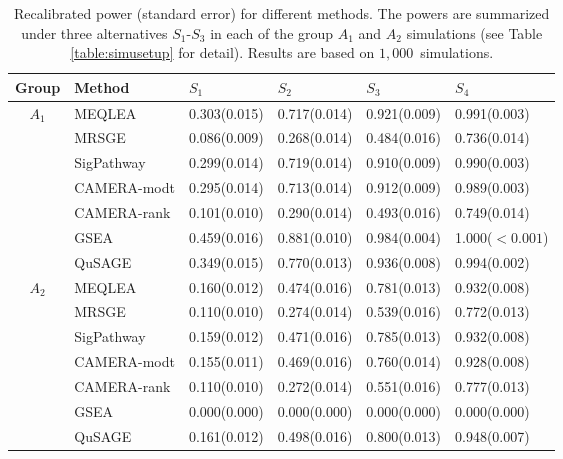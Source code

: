 \documentclass[useAMS,usenatbib, galley]{biom}
\newcommand{\CMR}{CAMERA-rank}
\newcommand{\CMT}{CAMERA-modt}
\newcommand{\gent}{SigPathway}
\newcommand{\genr}{MRSGE}
\newcommand{\HowmanySimu}{$1,000$}
\begin{document}
	\begin{table*}[ht]
			\centering
			\caption{Recalibrated power (standard error) for different methods. The powers are summarized under three alternatives $S_1$-$S_3$ in each of the group $A_1$ and $A_2$ simulations (see Table \ref{table:simusetup} for detail). Results are based on \HowmanySimu~simulations. }\label{table:power}
		\begin{tabular}{cl M{2.5cm}M{2.5cm}M{2.5cm}M{2.5cm}}
			\hline\hline
		Group & Method	& $S_1$ & $S_2$ & $S_3$	&$S_4$  \\ 
			\hline
		 &	MEQLEA  & 0.303(0.015) & 0.717(0.014) & 0.921(0.009) & 0.991(0.003) \\ 
		&	\genr & 0.086(0.009) & 0.268(0.014) & 0.484(0.016) & 0.736(0.014) \\ 
		&	\gent & 0.299(0.014) & 0.719(0.014) & 0.910(0.009) & 0.990(0.003) \\ 
		&	\CMT & 0.295(0.014) & 0.713(0.014) & 0.912(0.009) & 0.989(0.003) \\ 
		&	\CMR & 0.101(0.010) & 0.290(0.014) & 0.493(0.016) & 0.749(0.014)  \\ 
		&	GSEA & 0.459(0.016) & 0.881(0.010) & 0.984(0.004) & 1.000($<0.001$) \\ 
		&	QuSAGE & 0.349(0.015) & 0.770(0.013) & 0.936(0.008) & 0.994(0.002) \\ 
				\hline	
		 &	MEQLEA &  0.160(0.012) & 0.474(0.016) & 0.781(0.013) & 0.932(0.008) \\ 
		&		\genr & 0.110(0.010) & 0.274(0.014) & 0.539(0.016) & 0.772(0.013) \\ 
		&		\gent & 0.159(0.012) & 0.471(0.016) & 0.785(0.013) & 0.932(0.008) \\ 
		&		\CMT & 0.155(0.011) & 0.469(0.016) & 0.760(0.014) & 0.928(0.008) \\ 
		&		\CMR & 0.110(0.010) & 0.272(0.014) & 0.551(0.016) & 0.777(0.013) \\ 
		&		GSEA & 0.000(0.000) & 0.000(0.000) & 0.000(0.000) & 0.000(0.000) \\ 
		&		QuSAGE & 0.161(0.012) & 0.498(0.016) & 0.800(0.013) & 0.948(0.007) \\ 
				\hline\hline
		\end{tabular}
	\end{table*}
	
	
	
\end{document}

